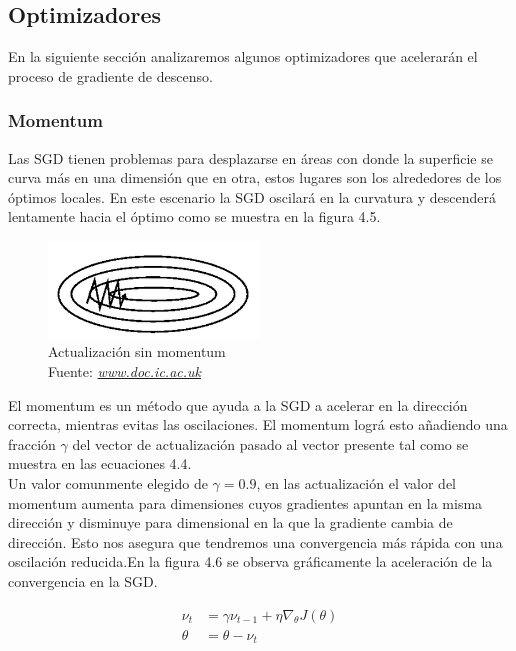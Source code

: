 \subsection{Optimizadores}
En la siguiente sección analizaremos algunos optimizadores que acelerarán el proceso de gradiente de descenso.
\subsubsection{Momentum}
Las SGD tienen problemas para desplazarse en áreas con donde la superficie se curva más en una dimensión que en otra, estos lugares son los alrededores de los óptimos locales. En este escenario la SGD oscilará en la curvatura y descenderá lentamente hacia el óptimo como se muestra en la figura 4.5.
\begin{figure}[H]
	\centering
	\includegraphics[width=0.5\textwidth]{Figures/momentum1.png}
	\caption{Actualización sin momentum \\ Fuente:  \href{https://www.doc.ic.ac.uk/~js4416/163/website/neural-networks/optimisers.html}{\textit{www.doc.ic.ac.uk}}}
	\label{momentum1}
\end{figure}
El momentum es un método que ayuda a la SGD a acelerar en la dirección correcta, mientras evitas las oscilaciones. El momentum lográ esto añadiendo una fracción $\gamma$ del vector de actualización pasado al vector presente tal como se muestra en las ecuaciones 4.4.\\ Un valor comunmente elegido de $\gamma =0.9 $, en las actualización el valor del momentum aumenta para dimensiones cuyos gradientes apuntan en la misma dirección y disminuye para dimensional en la que la gradiente cambia de dirección. Esto nos asegura que tendremos una convergencia más rápida con una oscilación reducida.En la figura 4.6 se observa gráficamente la aceleración de la convergencia en la SGD.

\begin{equation}
\label{mbgds}
\begin{aligned}
\nu_{t}&=\gamma \nu_{t-1} +  \eta \nabla_{\theta} J(\theta)\\
\theta &= \theta -\nu_{t}
\end{aligned}
\end{equation}

